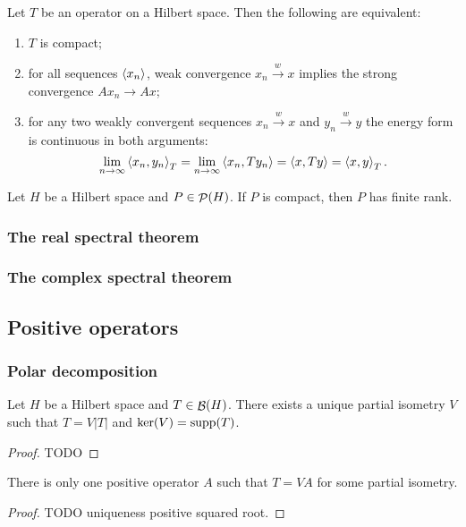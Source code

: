 \begin{proposition}
Let $T$ be an operator on a Hilbert space. Then the following are equivalent:
\begin{enumerate}
\item $T$ is compact;
\item for all sequences $\left\langle x_n \right\rangle$, weak convergence $x_n \overset{w}{\to} x$ implies the strong convergence $Ax_n \to Ax$;
\item for any two weakly convergent sequences $x_n\overset{w}{\to} x$ and $y_n\overset{w}{\to} y$ the energy form is continuous in both arguments:
\[ \lim_{n\to\infty}\left\langle x_n,y_n \right\rangle_T = \lim_{n\to\infty}\left\langle x_n,Ty_n \right\rangle = \left\langle x,Ty \right\rangle = \left\langle x,y \right\rangle_T. \]
\end{enumerate} 
\end{proposition}

\begin{lemma}
Let $H$ be a Hilbert space and $P\in\mathop{\mathcal{P}}\nolimits(H)$. If $P$ is compact, then $P$ has finite rank.
\end{lemma}

\subsubsection{The real spectral theorem}
\subsubsection{The complex spectral theorem}

\subsection{Positive operators}

\subsubsection{Polar decomposition}
\begin{proposition}
Let $H$ be a Hilbert space and $T\in \mathop{\mathcal{B}}(H)$. There exists a unique partial isometry $V$ such that $T = V|T|$ and $\ker(V) = \operatorname{supp}(T)$.
\end{proposition}
\begin{proof}
TODO
\end{proof}
\begin{lemma}
There is only one positive operator $A$ such that $T = VA$ for some partial isometry.
\end{lemma}
\begin{proof}
TODO uniqueness positive squared root.
\end{proof}

